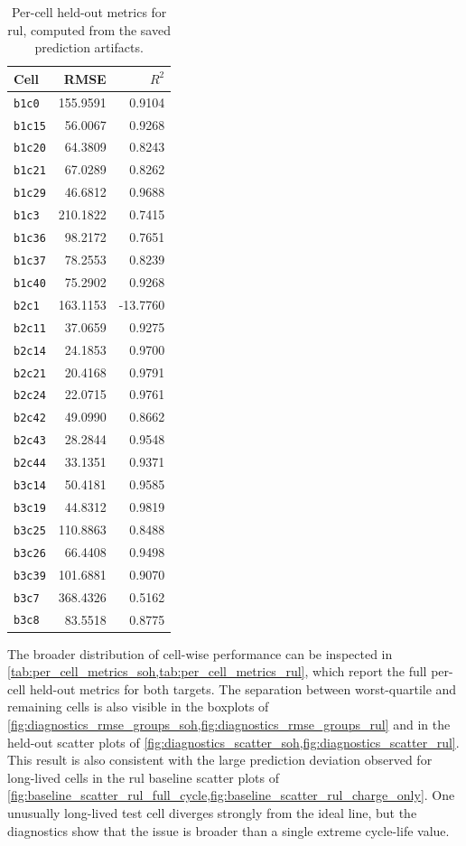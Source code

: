 \begin{table}[p]
    \centering
    \caption{Per-cell held-out metrics for \ac{rul}, computed from the saved prediction artifacts.}
    \label{tab:per_cell_metrics_rul}
    \begin{tabular}{lrr}
    \toprule
    Cell & RMSE & $R^2$ \\
    \midrule
    \texttt{b1c0} & 155.9591 & 0.9104 \\
    \texttt{b1c15} & 56.0067 & 0.9268 \\
    \texttt{b1c20} & 64.3809 & 0.8243 \\
    \texttt{b1c21} & 67.0289 & 0.8262 \\
    \texttt{b1c29} & 46.6812 & 0.9688 \\
    \texttt{b1c3} & 210.1822 & 0.7415 \\
    \texttt{b1c36} & 98.2172 & 0.7651 \\
    \texttt{b1c37} & 78.2553 & 0.8239 \\
    \texttt{b1c40} & 75.2902 & 0.9268 \\
    \texttt{b2c1} & 163.1153 & -13.7760 \\
    \texttt{b2c11} & 37.0659 & 0.9275 \\
    \texttt{b2c14} & 24.1853 & 0.9700 \\
    \texttt{b2c21} & 20.4168 & 0.9791 \\
    \texttt{b2c24} & 22.0715 & 0.9761 \\
    \texttt{b2c42} & 49.0990 & 0.8662 \\
    \texttt{b2c43} & 28.2844 & 0.9548 \\
    \texttt{b2c44} & 33.1351 & 0.9371 \\
    \texttt{b3c14} & 50.4181 & 0.9585 \\
    \texttt{b3c19} & 44.8312 & 0.9819 \\
    \texttt{b3c25} & 110.8863 & 0.8488 \\
    \texttt{b3c26} & 66.4408 & 0.9498 \\
    \texttt{b3c39} & 101.6881 & 0.9070 \\
    \texttt{b3c7} & 368.4326 & 0.5162 \\
    \texttt{b3c8} & 83.5518 & 0.8775 \\
    \bottomrule
    \end{tabular}
\end{table}

The broader distribution of cell-wise performance can be inspected in \cref{tab:per_cell_metrics_soh,tab:per_cell_metrics_rul}, which report the full per-cell held-out metrics for both targets. The separation between worst-quartile and remaining cells is also visible in the boxplots of \cref{fig:diagnostics_rmse_groups_soh,fig:diagnostics_rmse_groups_rul} and in the held-out scatter plots of \cref{fig:diagnostics_scatter_soh,fig:diagnostics_scatter_rul}. This result is also consistent with the large prediction deviation observed for long-lived cells in the \ac{rul} baseline scatter plots of \cref{fig:baseline_scatter_rul_full_cycle,fig:baseline_scatter_rul_charge_only}. One unusually long-lived test cell diverges strongly from the ideal line, but the diagnostics show that the issue is broader than a single extreme cycle-life value.

